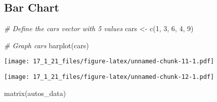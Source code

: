 \documentclass[
]{article}
\newenvironment{Shaded}{\begin{snugshade}}{\end{snugshade}}
\newcommand{\AttributeTok}[1]{\textcolor[rgb]{0.77,0.63,0.00}{#1}}
\newcommand{\CommentTok}[1]{\textcolor[rgb]{0.56,0.35,0.01}{\textit{#1}}}
\newcommand{\DecValTok}[1]{\textcolor[rgb]{0.00,0.00,0.81}{#1}}
\newcommand{\FunctionTok}[1]{\textcolor[rgb]{0.00,0.00,0.00}{#1}}
\newcommand{\NormalTok}[1]{#1}
\newcommand{\OtherTok}[1]{\textcolor[rgb]{0.56,0.35,0.01}{#1}}
\newcommand{\SpecialCharTok}[1]{\textcolor[rgb]{0.00,0.00,0.00}{#1}}
\newcommand{\StringTok}[1]{\textcolor[rgb]{0.31,0.60,0.02}{#1}}
\begin{document}
\hypertarget{bar-chart}{%
\subsection{Bar Chart}\label{bar-chart}}

\begin{Shaded}
\begin{Highlighting}[]
\CommentTok{\# Define the cars vector with 5 values}
\NormalTok{cars }\OtherTok{\textless{}{-}} \FunctionTok{c}\NormalTok{(}\DecValTok{1}\NormalTok{, }\DecValTok{3}\NormalTok{, }\DecValTok{6}\NormalTok{, }\DecValTok{4}\NormalTok{, }\DecValTok{9}\NormalTok{)}

\CommentTok{\# Graph cars}
\FunctionTok{barplot}\NormalTok{(cars)}
\end{Highlighting}
\end{Shaded}

\texttt{[image: 17\_1\_21\_files/figure-latex/unnamed-chunk-11-1.pdf]}

\begin{Shaded}
\end{Shaded}

\texttt{[image: 17\_1\_21\_files/figure-latex/unnamed-chunk-12-1.pdf]}

\begin{Shaded}
\begin{Highlighting}[]
\FunctionTok{matrix}\NormalTok{(autos\_data)}
\end{Highlighting}
\end{Shaded}
\end{document}
